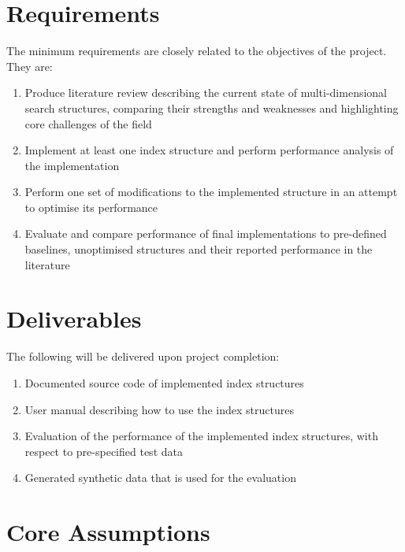 \section{Requirements}
\label{sec:requirements}

The minimum requirements are closely related to the objectives of the project. They are:
\begin{enumerate}
	\item Produce literature review describing the current state of multi-dimensional search structures, comparing their strengths and weaknesses and highlighting core challenges of the field
	\item Implement at least one index structure and perform performance analysis of the implementation
	\item Perform one set of modifications to the implemented structure in an attempt to optimise its performance
	\item Evaluate and compare performance of final implementations to pre-defined baselines, unoptimised structures and their reported performance in the literature
\end{enumerate}

\section{Deliverables}
\label{sec:deliverables}

The following will be delivered upon project completion:
\begin{enumerate}
	\item Documented source code of implemented index structures
	\item User manual describing how to use the index structures
	\item Evaluation of the performance of the implemented index structures, with respect to pre-specified test data
	\item Generated synthetic data that is used for the evaluation
\end{enumerate}

\section{Core Assumptions}
\label{sec:core-assumptions}

